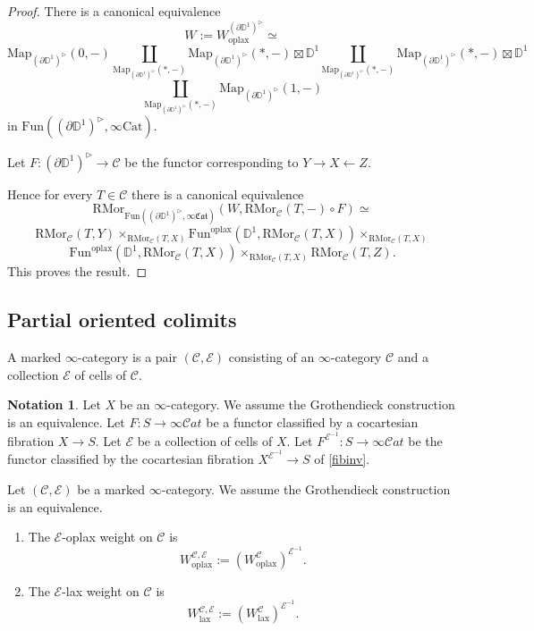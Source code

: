 \documentclass[10pt,oneside]{article}
\numberwithin{equation}{section} %
\numberwithin{figure}{section} %
\theoremstyle{plain}
\theoremstyle{definition}
\newtheorem{notation}[thm]{Notation}
\newcommand{\bD}{{\mathbb D}}
\newcommand{\mC}{{\mathcal C}}
\newcommand{\mE}{{\mathcal E}}
\newcommand{\W}{W}
\newcommand{\Cat}{\mathrm{Cat}}
\newcommand{\Fun}{\mathrm{Fun}}
\newcommand{\lax}{{\mathrm{lax}}}
\newcommand{\oplax}{{\mathrm{oplax}}}
\newcommand{\Map}{{\mathrm{Map}}}
\newcommand{\RMor}{\mathrm{RMor}}
\newcommand{\scat}{\mathcal{C}\mathit{at}}
\newcommand{\fcat}{\mathfrak{Cat}}
\begin{document}
\begin{proof}

There is a canonical equivalence
$$ W:= W^{(\partial\bD^1)^{\triangleright}}_{\oplax} \simeq $$$$ \Map_{(\partial\bD^1)^{\triangleright}}(0,-) \coprod_{\Map_{(\partial\bD^1)^{\triangleright}}(*,-)} \Map_{(\partial\bD^1)^{\triangleright}}(*,-) \boxtimes \bD^1 \coprod_{\Map_{(\partial\bD^1)^{\triangleright}}(*,-)} \Map_{(\partial\bD^1)^{\triangleright}}(*,-) \boxtimes \bD^1 $$$$ \coprod_{\Map_{(\partial\bD^1)^{\triangleright}}(*,-)}\Map_{(\partial\bD^1)^{\triangleright}}(1,-)  $$
in $\Fun((\partial\bD^1)^{\triangleright}, \infty\Cat) .$

Let $F: (\partial\bD^1)^{\triangleright} \to \mC $ be the functor 
corresponding to $Y \to X \leftarrow Z$.

Hence for every $T \in \mC$ there is a canonical equivalence
$$ \RMor_{\Fun((\partial\bD^1)^{\triangleright}, \infty\fcat)}(W, \RMor_{\mC}(T,-) \circ F) \simeq $$
$$ \RMor_{\mC}(T, Y) \times_{\RMor_{\mC}(T, X)} \Fun^\oplax(\bD^1, \RMor_{\mC}(T, X)) \times_{\RMor_{\mC}(T, X)} $$$$ \Fun^\oplax(\bD^1, \RMor_{\mC}(T, X)) \times_{\RMor_{\mC}(T, X)} \RMor_{\mC}(T, Z).$$
This proves the result.
\end{proof}

\subsection{Partial oriented colimits}

\begin{definition}

A marked $\infty$-category is a pair $(\mC,\mE)$ consisting of an $\infty$-category $\mC$ and a collection  $\mE$ of cells of $\mC.$
    
\end{definition}

\begin{notation}Let $X$ be an $\infty$-category.
We assume the Grothendieck construction is an equivalence.
Let $F: S \to \infty\scat$ be a functor classified by a cocartesian fibration $X \to S.$ Let $\mE$ be a collection of cells of $X.$
Let $F^{\mE^{-1}}: S \to \infty\scat$ be the functor classified by the cocartesian fibration $X^{\mE^{-1}} \to S$ of \cref{fibinv}.

    
\end{notation}

\begin{definition}Let $(\mC, \mE)$ be a marked $\infty$-category.
We assume the Grothendieck construction is an equivalence.
\begin{enumerate}[\normalfont(1)]\setlength{\itemsep}{-2pt}
\item The $\mE$-oplax weight on $\mC$ is $$ \W^{\mC,\mE}_\oplax:= (\W^{\mC}_\oplax)^{\mE^{-1}}.$$

\item The $\mE$-lax weight on $\mC$ is $$ \W^{\mC,\mE}_\lax:=(\W_\lax ^{\mC})^{\mE^{-1}}.$$

\end{enumerate}

\end{definition} 
\end{document}
